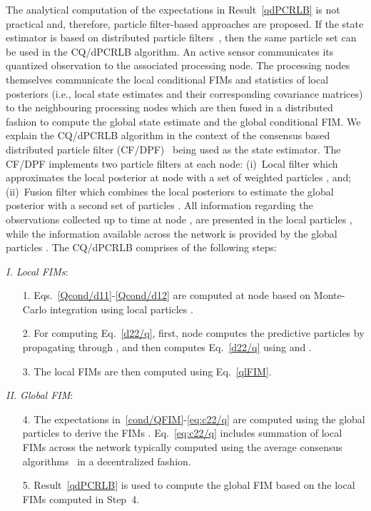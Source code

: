 \documentclass[10pt,twocolumn,twoside]{IEEEtran}
\begin{document}
The analytical computation of the expectations in
Result~\ref{qdPCRLB}
is not practical and,
therefore, particle filter-based approaches are proposed.  If the
state estimator is based on distributed particle
filters~\cite{Arash:TSP1}, then the same particle set can be used in
the CQ/dPCRLB algorithm.
An active sensor  communicates its quantized observation to the associated processing  node. The processing nodes themselves communicate  the local conditional FIMs  and statistics of local posteriors  (i.e., local state estimates and their corresponding covariance matrices) to the neighbouring processing nodes which are then fused in a distributed fashion to compute the global state estimate and the global conditional FIM.
We explain the CQ/dPCRLB algorithm in the
context of the consensus based distributed particle filter
(CF/DPF)~\cite{Arash:TSP1} being used as the state estimator.  The
CF/DPF implements two particle filters at each node:
(i)~Local filter which approximates the local posterior at node 
with a set of weighted particles , and;
(ii)~Fusion filter which combines the local posteriors to estimate the
global posterior with a second set of particles .
All information regarding the observations collected up to time  at
node , are presented in the local particles ,
while the information available across the network is provided by the
global particles .
The CQ/dPCRLB comprises of the following steps:

\noindent
\textit{I. Local FIMs}:
\begin{enumerate}
\item[1.] Eqs.~\eqref{Qcond/d11}-\eqref{Qcond/d12} are computed at
  node  based on Monte-Carlo integration using local particles
  .
\item[2.] For computing Eq.~\eqref{d22/q}, first, node  computes
  the predictive particles  by propagating
   through , and then
  computes Eq.~\eqref{d22/q} using  and
  .
\item[3.] The local FIMs are then computed using Eq.~\eqref{qlFIM}.
\end{enumerate}
\noindent
\textit{II. Global FIM}:
\begin{enumerate}
\item[4.] The expectations in~\eqref{cond/QFIM}-\eqref{eq:c22/q} are
  computed using the global particles  to derive
  the FIMs . Eq.~\eqref{eq:c22/q} includes
  summation of local FIMs across the network typically computed using
  the average consensus algorithms~\cite{Arash:SPL} in a decentralized
  fashion.
\item[5.]
Result~\ref{qdPCRLB}
is used to compute the global FIM based on the local FIMs computed in
  Step~4.
\end{enumerate}
\end{document}
